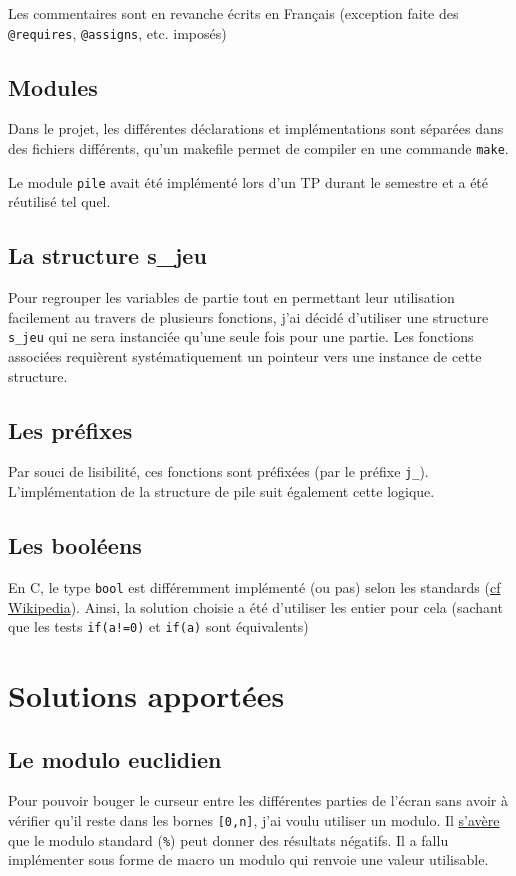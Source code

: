 \documentclass[a4paper, titlepage]{article}
\begin{document}
Les commentaires sont en revanche écrits en Français (exception faite des \texttt{@requires}, \texttt{@assigns}, etc. imposés)

\subsection{Modules}
Dans le projet, les différentes déclarations et implémentations sont séparées dans des fichiers différents, qu'un makefile permet de compiler en une commande \texttt{make}.

Le module \texttt{pile} avait été implémenté lors d'un TP durant le semestre et a été réutilisé tel quel.

\subsection{La structure s\_jeu}
Pour regrouper les variables de partie tout en permettant leur utilisation facilement au travers de plusieurs fonctions, j'ai décidé d'utiliser une structure \texttt{s\_jeu} qui ne sera instanciée qu'une seule fois pour une partie. Les fonctions associées requièrent systématiquement un pointeur vers une instance de cette structure.

\subsection{Les préfixes}
Par souci de lisibilité, ces fonctions sont préfixées (par le préfixe \texttt{j\_}). L'implémentation de la structure de pile suit également cette logique.

\subsection{Les booléens}
En C, le type \texttt{bool} est différemment implémenté (ou pas) selon les standards (\href{https://en.wikipedia.org/wiki/C_data_types#stdbool.h}{cf Wikipedia}). Ainsi, la solution choisie a été d'utiliser les entier pour cela (sachant que les tests \texttt{if(a!=0)} et \texttt{if(a)} sont équivalents)

\section{Solutions apportées}
\subsection{Le modulo euclidien}
Pour pouvoir bouger le curseur entre les différentes parties de l'écran sans avoir à vérifier qu'il reste dans les bornes \texttt{[0,n]}, j'ai voulu utiliser un modulo.
Il \href{http://stackoverflow.com/questions/11714555/modulo-c-math-way}{s'avère} que le modulo standard (\texttt{\%}) peut donner des résultats négatifs. Il a fallu implémenter sous forme de macro un modulo qui renvoie une valeur utilisable.
\end{document}
